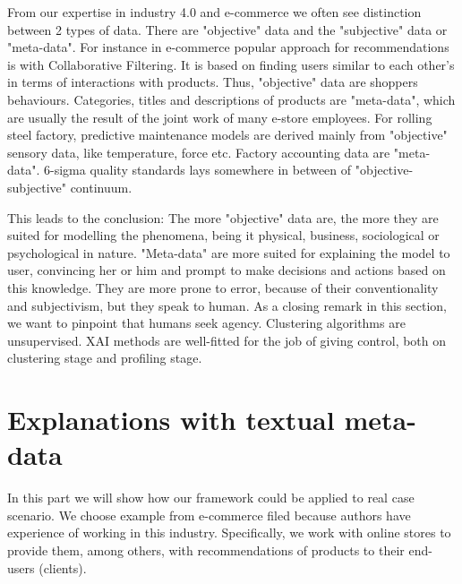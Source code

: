 \documentclass[
 twocolumn,
]{ceurart}
\begin{document}
From our expertise in industry 4.0 and e-commerce we often see distinction between 2 types of data.
There are "objective" data and the "subjective" data or "meta-data".
For instance in e-commerce popular approach for recommendations is with Collaborative Filtering.
It is based on finding users similar to each other's in terms of interactions with products.
Thus, "objective" data are shoppers behaviours.
Categories, titles and descriptions of products are "meta-data", which are usually the result of the joint work of many e-store employees.
For rolling steel factory, predictive maintenance models are derived mainly from "objective" sensory data, like temperature, force etc.
Factory accounting data are "meta-data".
6-sigma quality standards lays somewhere in between of "objective-subjective" continuum.

This leads to the conclusion:
The more "objective" data are, the more they are suited for modelling the phenomena, being it physical, business, sociological or psychological in nature.
"Meta-data" are more suited for explaining the model to user, convincing her or him and prompt to make decisions and actions based on this knowledge.
They are more prone to error, because of their conventionality and subjectivism, but they speak to human.
As a closing remark in this section, we want to pinpoint that humans seek agency.
Clustering algorithms are unsupervised.
XAI methods are well-fitted for the job of giving control, both on clustering stage and profiling stage.


\section{Explanations with textual meta-data}
In this part we will show how our framework could be applied to real case scenario.
We choose example from e-commerce filed because authors have experience of working in this industry.
Specifically, we work with online stores to provide them, among others, with recommendations of products to their end-users (clients).
\end{document}

